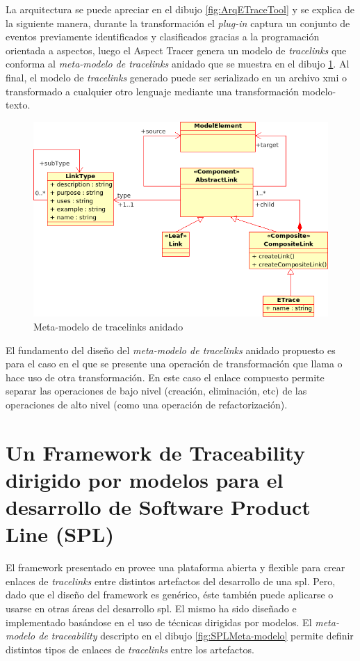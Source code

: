 \documentclass[a4paper,12pt,twoside,spanish,openright]{book}
\begin{document}
La arquitectura se puede apreciar en el dibujo \ref{fig:ArqETraceTool} y se explica de la siguiente manera, durante la transformación el \textit{plug-in} captura un conjunto de eventos previamente identificados y clasificados gracias a la programación orientada a aspectos, luego el \textsf{Aspect Tracer} genera un modelo de \textit{tracelinks} que conforma al \textit{meta-modelo de tracelinks} anidado que se muestra en el dibujo \ref{fig:ETraceToolMeta-modelo}. Al final, el modelo de \textit{tracelinks} generado puede ser serializado en un archivo \gls{xmi} o transformado a cualquier otro lenguaje mediante una transformación modelo-texto.

\begin{figure}[hbtp]
\centering
\includegraphics[scale=0.6]{./img/NestedTraceMetamodel}
\caption{Meta-modelo de tracelinks anidado}
\label{fig:ETraceToolMeta-modelo}
\end{figure}

El fundamento del diseño del \textit{meta-modelo de tracelinks} anidado propuesto es para el caso en el que se presente una operación de transformación que llama o hace uso de otra transformación. En este caso el enlace compuesto permite separar las operaciones de bajo nivel (creación, eliminación, etc) de las operaciones de alto nivel (como una operación de refactorización).

\section{Un Framework de Traceability dirigido por modelos para el desarrollo de Software Product Line (SPL)}

El framework presentado en \cite{SousaKuleszaRummlerAnquetilMitschkeMoreiraAmaralAraujo} provee una plataforma abierta y flexible para crear enlaces de \textit{tracelinks} entre distintos artefactos del desarrollo de una \gls{spl}. Pero, dado que el diseño del framework es genérico, éste también puede aplicarse o usarse en otras áreas del desarrollo \gls{spl}. El mismo ha sido diseñado e implementado basándose en el uso de técnicas dirigidas por modelos. El \textit{meta-modelo de traceability} descripto en el dibujo \ref{fig:SPLMeta-modelo} permite definir distintos tipos de enlaces de \textit{tracelinks} entre los artefactos.
\end{document}
